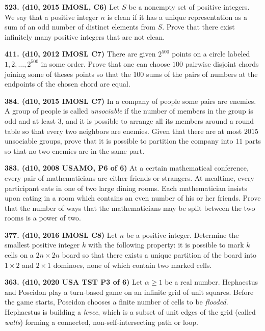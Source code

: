 \documentclass{article}
\begin{document}
\textbf{523. (\color{red}d10\color{black}, 2015 IMOSL, C6)} Let $S$ be a nonempty set of positive integers. We say that a positive integer $n$ is clean if it has a unique representation as a sum of an odd number of distinct elements from $S$. Prove that there exist infinitely many positive integers that are not clean.

\textbf{411. (\color{red}d10\color{black}, 2012 IMOSL C7)} There are given $2^{500}$ points on a circle labeled $1,2,\ldots ,2^{500}$ in some order. Prove that one can choose $100$ pairwise disjoint chords joining some of theses points so that the $100$ sums of the pairs of numbers at the endpoints of the chosen chord are equal.

\textbf{384. (\color{red}d10\color{black}, 2015 IMOSL C7)} In a company of people some pairs are enemies. A group of people is called \textit{unsociable} if the number of members in the group is odd and at least $3$, and it is possible to arrange all its members around a round table so that every two neighbors are enemies. Given that there are at most $2015$ unsociable groups, prove that it is possible to partition the company into $11$ parts so that no two enemies are in the same part.

\textbf{383. (\color{red}d10\color{black}, 2008 USAMO, P6 of 6)} At a certain mathematical conference, every pair of mathematicians are either friends or strangers. At mealtime, every participant eats in one of two large dining rooms. Each mathematician insists upon eating in a room which contains an even number of his or her friends. Prove that the number of ways that the mathematicians may be split between the two rooms is a power of two.

\textbf{377. (\color{red}d10\color{black}, 2016 IMOSL C8)} Let $n$ be a positive integer. Determine the smallest positive integer $k$ with the following property: it is possible to mark $k$ cells on a $2n \times 2n$ board so that there exists a unique partition of the board into $1 \times 2$ and $2 \times 1$ dominoes, none of which contain two marked cells.

\textbf{363. (\color{red}d10\color{black}, 2020 USA TST P3 of 6)} Let $\alpha \geq 1$ be a real number. Hephaestus and Poseidon play a turn-based game on an infinite grid of unit squares. Before the game starts, Poseidon chooses a finite number of cells to be \textit{flooded}. Hephaestus is building a \textit{levee}, which is a subset of unit edges of the grid (called \textit{walls}) forming a connected, non-self-intersecting path or loop.
\end{document}
